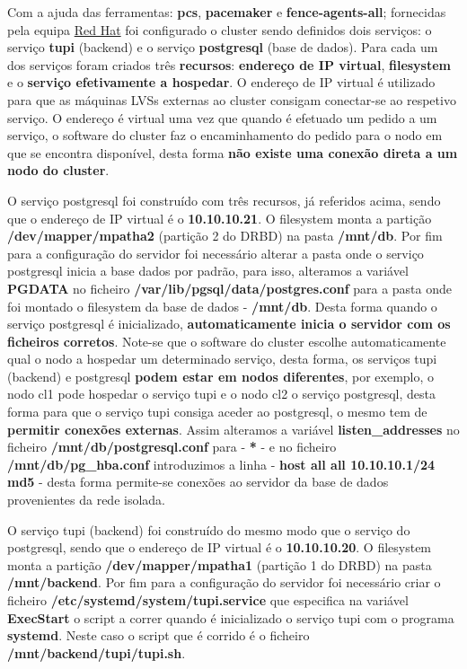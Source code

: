 \hspace{5mm} Com a ajuda das ferramentas: \textbf{pcs}, \textbf{pacemaker} e \textbf{fence-agents-all}; fornecidas pela equipa \href{https://www.redhat.com/}{Red Hat} foi configurado o cluster sendo definidos dois serviços: o serviço \textbf{tupi} (backend) e o serviço \textbf{postgresql} (base de dados). Para cada um dos serviços foram criados três \textbf{recursos}: \textbf{endereço de IP virtual}, \textbf{filesystem} e o \textbf{serviço efetivamente a hospedar}. O endereço de IP virtual é utilizado para que as máquinas LVSs externas ao cluster consigam conectar-se ao respetivo serviço. O endereço é virtual uma vez que quando é efetuado um pedido a um serviço, o software do cluster faz o encaminhamento do pedido para o nodo em que se encontra disponível, desta forma \textbf{não existe uma conexão direta a um nodo do cluster}.

\hspace{5mm} O serviço postgresql foi construído com três recursos, já referidos acima, sendo que o endereço de IP virtual é o \textbf{10.10.10.21}. O filesystem monta a partição \textbf{/dev/mapper/mpatha2} (partição 2 do DRBD) na pasta \textbf{/mnt/db}. Por fim para a configuração do servidor foi necessário alterar a pasta onde o serviço postgresql inicia a base dados por padrão, para isso, alteramos a variável \textbf{PGDATA} no ficheiro \textbf{/var/lib/pgsql/data/postgres.conf} para a pasta onde foi montado o filesystem da base de dados - \textbf{/mnt/db}. Desta forma quando o serviço postgresql é inicializado, \textbf{automaticamente inicia o servidor com os ficheiros corretos}. Note-se que o software do cluster escolhe automaticamente qual o nodo a hospedar um determinado serviço, desta forma, os serviços tupi (backend) e postgresql \textbf{podem estar em nodos diferentes}, por exemplo, o nodo cl1 pode hospedar o serviço tupi e o nodo cl2 o serviço postgresql, desta forma para que o serviço tupi consiga aceder ao postgresql, o mesmo tem de \textbf{permitir conexões externas}. Assim alteramos a variável \textbf{listen\_addresses} no ficheiro \textbf{/mnt/db/postgresql.conf} para - \textbf{*} - e no ficheiro \textbf{/mnt/db/pg\_hba.conf} introduzimos a linha - \textbf{host all all 10.10.10.1/24 md5} - desta forma permite-se conexões ao servidor da base de dados provenientes da rede isolada.

\hspace{5mm} O serviço tupi (backend) foi construído do mesmo modo que o serviço do postgresql, sendo que o endereço de IP virtual é o \textbf{10.10.10.20}. O filesystem monta a partição \textbf{/dev/mapper/mpatha1} (partição 1 do DRBD) na pasta \textbf{/mnt/backend}. Por fim para a configuração do servidor foi necessário criar o ficheiro \textbf{/etc/systemd/system/tupi.service} que especifica na variável \textbf{ExecStart} o script a correr quando é inicializado o serviço tupi com o programa \textbf{systemd}. Neste caso o script que é corrido é o ficheiro \textbf{/mnt/backend/tupi/tupi.sh}.

